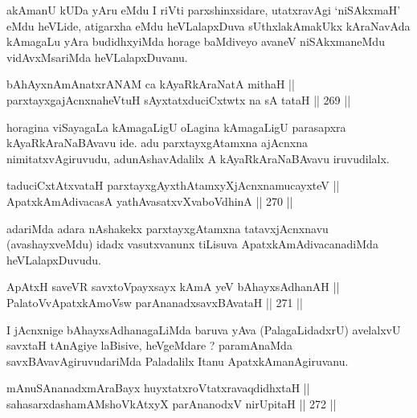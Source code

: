 \begin{artha}
akAmanU kUDa yAru eMdu I riVti parxshinxsidare, utatxravAgi
`niSAkxmaH' eMdu heVLide, atigarxha eMdu heVLalapxDuva sUthxlakAmakUkx
kAraNavAda kAmagaLu yAra budidhxyiMda horage baMdiveyo avaneV
niSAkxmaneMdu vidAvxMsariMda heVLalapxDuvanu.
\end{artha}

\begin{shl}
bAhAyxnAmAnatxrANAM ca kAyaRkAraNatA mithaH || \\
parxtayxgajAcnxnaheVtuH sAyxtatxduciCxtwtx na sA tataH ||  269 ||  
\end{shl}

\begin{artha}
horagina viSayagaLa kAmagaLigU oLagina kAmagaLigU parasapxra
kAyaRkAraNaBAvavu ide. adu parxtayxgAtamxna ajAcnxna
nimitatxvAgiruvudu, adunAshavAdalilx A kAyaRkAraNaBAvavu iruvudilalx.
\end{artha}


\begin{shl}
taduciCxtAtxvataH parxtayxgAyxthAtamxyXjAcnxnamucayxteV || \\
ApatxkAmAdivacasA yathAvasatxvXvaboVdhinA ||  270 ||  
\end{shl}

\begin{artha}
adariMda adara nAshakekx parxtayxgAtamxna tatavxjAcnxnavu
(avashayxveMdu) idadx vasutxvanunx tiLisuva ApatxkAmAdivacanadiMda heVLalapxDuvudu.
\end{artha}


\begin{shl}
ApAtxH saveVR savxtoV\s payxsayx kAmA yeV bAhayxsAdhanAH || \\
PalatoV\s vApatxkAmoV\s sw parAnanadxsavxBAvataH ||  271 ||  
\end{shl}

\begin{artha}
I jAcnxnige bAhayxsAdhanagaLiMda baruva yAva (PalagaLidadxrU)
avelalxvU savxtaH tAnAgiye laBisive, heVgeMdare  ? paramAnaMda
savxBAvavAgiruvudariMda Paladalilx Itanu ApatxkAmanAgiruvanu.
\end{artha}


\begin{shl}
mAnuSAnanadxmAraBayx huyxtatxroVtatxravaqdidhxtaH || \\
sahasarxdashamAMshoVkAtxyX parAnanodxV nirUpitaH ||  272 ||  
\end{shl}

